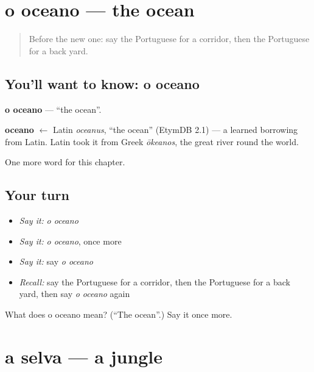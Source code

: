 \section[o oceano]{o oceano — the ocean}

\label{lesson:PT-C255-oceano}



\begin{quote}
Before the new one: say the Portuguese for a corridor, then the Portuguese for a back yard.
\end{quote}

\subsection*{You'll want to know: o oceano}
\textbf{o oceano} — \textquotedblleft{}the ocean\textquotedblright{}.

\begin{cousinweb}
\textbf{oceano} $\leftarrow$ Latin \emph{oceanus}, \textquotedblleft{}the ocean\textquotedblright{} (EtymDB 2.1) — a learned borrowing from Latin. Latin took it from Greek \emph{ōkeanos}, the great river round the world.
\end{cousinweb}

\begin{grammarlens}[title={What you've built}]
One more word for this chapter.
\end{grammarlens}

\subsection*{Your turn}
\begin{itemize}
\raggedright
  \item \emph{Say it:} \emph{o oceano}
  \item \emph{Say it:} \emph{o oceano}, once more
  \item \emph{Say it:} say \emph{o oceano}
  \item \emph{Recall:} say the Portuguese for a corridor, then the Portuguese for a back yard, then say \emph{o oceano} again
\end{itemize}

\begin{tcolorbox}[breakable,colback=teal!4,colframe=teal!35!black,title={Before you move on}]
What does o oceano mean? (\textquotedblleft{}The ocean\textquotedblright{}.) Say it once more.
\end{tcolorbox}
\section[a selva]{a selva — a jungle}

